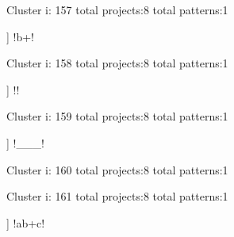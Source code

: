 Cluster i: 157
total projects:8
total patterns:1
\begin{multicols}{1}
\begin{description}[noitemsep,topsep=0pt]
\item [[8] ] \cverb!b+!
\end{description}
\end{multicols}







Cluster i: 158
total projects:8
total patterns:1
\begin{multicols}{1}
\begin{description}[noitemsep,topsep=0pt]
\item [[8] ] \cverb!\*!
\end{description}
\end{multicols}







Cluster i: 159
total projects:8
total patterns:1
\begin{multicols}{1}
\begin{description}[noitemsep,topsep=0pt]
\item [[8] ] \cverb!___!
\end{description}
\end{multicols}







Cluster i: 160
total projects:8
total patterns:1
\begin{multicols}{1}
\begin{description}[noitemsep,topsep=0pt]
\item [[8] ] \cverb!\.$!
\end{description}
\end{multicols}







Cluster i: 161
total projects:8
total patterns:1
\begin{multicols}{1}
\begin{description}[noitemsep,topsep=0pt]
\item [[8] ] \cverb!ab+c!
\end{description}
\end{multicols}







